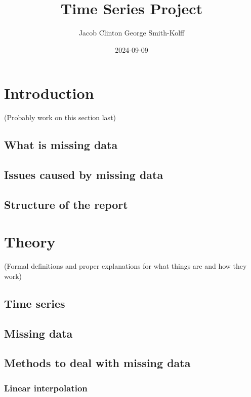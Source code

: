 \documentclass[
]{report}
\title{Time Series Project}
\author{Jacob Clinton George Smith-Kolff}
\date{2024-09-09}
\begin{document}
\maketitle

{
\setcounter{tocdepth}{1}
\tableofcontents
}
\chapter{Introduction}\label{introduction}

(Probably work on this section last)

\section{What is missing data}\label{what-is-missing-data}

\section{Issues caused by missing
data}\label{issues-caused-by-missing-data}

\section{Structure of the report}\label{structure-of-the-report}

\chapter{Theory}\label{theory}

(Formal definitions and proper explanations for what things are and how
they work)

\section{Time series}\label{time-series}

\section{Missing data}\label{missing-data}

\section{Methods to deal with missing
data}\label{methods-to-deal-with-missing-data}

\subsection{Linear interpolation}\label{linear-interpolation}
\end{document}
